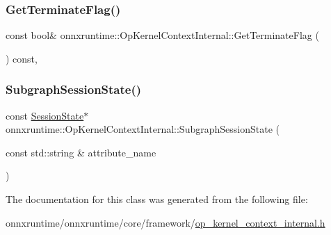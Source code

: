 \mbox{\label{classonnxruntime_1_1OpKernelContextInternal_af38fb99b3a485d343ecbad2926c0c921}} 
\subsubsection{\texorpdfstring{Get\+Terminate\+Flag()}{GetTerminateFlag()}}
{\footnotesize\ttfamily const bool\& onnxruntime\+::\+Op\+Kernel\+Context\+Internal\+::\+Get\+Terminate\+Flag (\begin{DoxyParamCaption}{ }\end{DoxyParamCaption}) const\hspace{0.3cm}{\ttfamily [inline]}, {\ttfamily [noexcept]}}

\mbox{\label{classonnxruntime_1_1OpKernelContextInternal_ae6c150d6d6d27669b65f556b45be25ce}} 
\subsubsection{\texorpdfstring{Subgraph\+Session\+State()}{SubgraphSessionState()}}
{\footnotesize\ttfamily const \mbox{\hyperlink{classonnxruntime_1_1SessionState}{Session\+State}}$\ast$ onnxruntime\+::\+Op\+Kernel\+Context\+Internal\+::\+Subgraph\+Session\+State (\begin{DoxyParamCaption}\item[{const std\+::string \&}]{attribute\+\_\+name }\end{DoxyParamCaption})\hspace{0.3cm}{\ttfamily [inline]}}



The documentation for this class was generated from the following file\+:\begin{DoxyCompactItemize}
\item 
onnxruntime/onnxruntime/core/framework/\mbox{\hyperlink{op__kernel__context__internal_8h}{op\+\_\+kernel\+\_\+context\+\_\+internal.\+h}}\end{DoxyCompactItemize}
